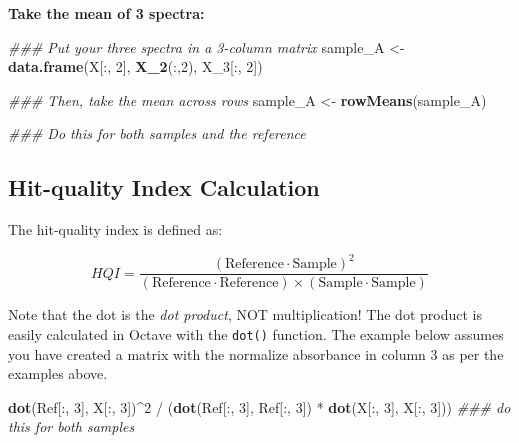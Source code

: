 \documentclass[]{tufte-book}
\newenvironment{Shaded}{}{}
\newcommand{\CommentTok}[1]{\textcolor[rgb]{0.38,0.63,0.69}{\textit{#1}}}
\newcommand{\DecValTok}[1]{\textcolor[rgb]{0.25,0.63,0.44}{#1}}
\newcommand{\KeywordTok}[1]{\textcolor[rgb]{0.00,0.44,0.13}{\textbf{#1}}}
\newcommand{\NormalTok}[1]{#1}
\newcommand{\OperatorTok}[1]{\textcolor[rgb]{0.40,0.40,0.40}{#1}}
\newcommand{\StringTok}[1]{\textcolor[rgb]{0.25,0.44,0.63}{#1}}
\begin{document}
\textbf{Take the mean of 3 spectra:}

\begin{Shaded}
\begin{Highlighting}[]
\CommentTok{### Put your three spectra in a 3-column matrix}
\NormalTok{sample_A <-}\StringTok{ }\KeywordTok{data.frame}\NormalTok{(X[}\OperatorTok{:}\NormalTok{, }\DecValTok{2}\NormalTok{], }\KeywordTok{X_2}\NormalTok{(}\OperatorTok{:}\NormalTok{,}\DecValTok{2}\NormalTok{), X_}\DecValTok{3}\NormalTok{[}\OperatorTok{:}\NormalTok{, }\DecValTok{2}\NormalTok{])}

\CommentTok{### Then, take the mean across rows}
\NormalTok{sample_A <-}\StringTok{ }\KeywordTok{rowMeans}\NormalTok{(sample_A) }

\CommentTok{### Do this for both samples and the reference}
\end{Highlighting}
\end{Shaded}

\hypertarget{hit-quality-index-calculation}{%
\subsection*{Hit-quality Index Calculation}\label{hit-quality-index-calculation}}

The hit-quality index is defined as:

\[
HQI = \frac{(\text{Reference} \cdot \text{Sample})^2}{(\text{Reference} \cdot \text{Reference}) \times (\text{Sample} \cdot \text{Sample})}
\]

Note that the dot is the \emph{dot product}, NOT multiplication! The dot product is easily calculated in Octave with the \texttt{dot()} function. The example below assumes you have created a matrix with the normalize absorbance in column 3 as per the examples above.

\begin{Shaded}
\begin{Highlighting}[]
\KeywordTok{dot}\NormalTok{(Ref[}\OperatorTok{:}\NormalTok{, }\DecValTok{3}\NormalTok{], X[}\OperatorTok{:}\NormalTok{, }\DecValTok{3}\NormalTok{])}\OperatorTok{^}\DecValTok{2} \OperatorTok{/}\StringTok{ }\NormalTok{(}\KeywordTok{dot}\NormalTok{(Ref[}\OperatorTok{:}\NormalTok{, }\DecValTok{3}\NormalTok{], Ref[}\OperatorTok{:}\NormalTok{, }\DecValTok{3}\NormalTok{]) }\OperatorTok{*}\StringTok{ }\KeywordTok{dot}\NormalTok{(X[}\OperatorTok{:}\NormalTok{, }\DecValTok{3}\NormalTok{], X[}\OperatorTok{:}\NormalTok{, }\DecValTok{3}\NormalTok{]))}
\CommentTok{### do this for both samples}
\end{Highlighting}
\end{Shaded}
\end{document}
